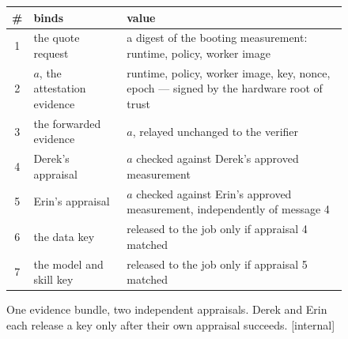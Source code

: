\begin{figure}[H]
\begin{tikzpicture}[pd figure,x=1cm,y=1cm]
\end{tikzpicture}
\vspace{4pt}
\footnotesize
{}
\begin{tabularx}{\linewidth}{@{}c >{\raggedright\arraybackslash}p{2.4cm} >{\raggedright\arraybackslash}X@{}}
\toprule
\# & binds & value \\
\midrule
1 & the quote request & a digest of the booting measurement: runtime, policy, worker image \\
2 & $a$, the attestation evidence & runtime, policy, worker image, key, nonce, epoch --- signed by the hardware root of trust \\
3 & the forwarded evidence & $a$, relayed unchanged to the verifier \\
4 & Derek's appraisal & $a$ checked against Derek's approved measurement \\
5 & Erin's appraisal & $a$ checked against Erin's approved measurement, independently of message 4 \\
6 & the data key & released to the job only if appraisal 4 matched \\
7 & the model and skill key & released to the job only if appraisal 5 matched \\
\bottomrule
\end{tabularx}
\caption{One evidence bundle, two independent appraisals. Derek and Erin
each release a key only after their own appraisal succeeds. [internal]}
\label{fig:sealed-dual-attestation}
\end{figure}
